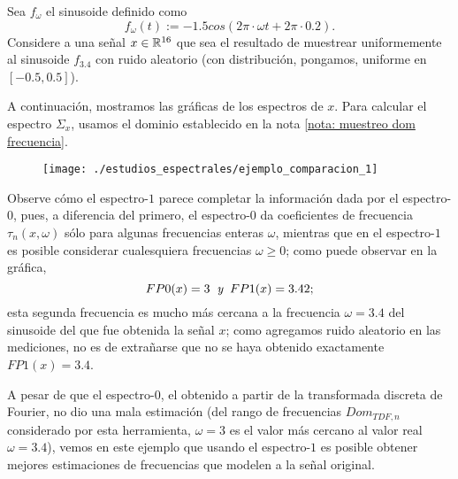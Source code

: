 \begin{ejemplo}
\label{ej: espectros comparacion}

Sea $f_{\omega}$
el sinusoide definido como
\begin{equation}
\label{eq: sinusoide eje}
f_{\omega}(t) := -1.5 cos (2 \pi \cdot \omega t + 2 \pi \cdot 0.2).
\end{equation}
Considere a una señal $x \in \mathbb{R}^{16}$ que sea el resultado
de muestrear uniformemente al sinusoide
$f_{3.4}$
con ruido aleatorio 
(con distribución, pongamos, uniforme en $[-0.5, 0.5]$).

A continuación, mostramos las gráficas
de los espectros de $x$. Para
calcular el espectro $\Sigma_{x}$,
usamos el dominio
establecido en la nota 
\ref{nota: muestreo dom frecuencia}.

\begin{figure}[H]
\centering
    \texttt{[image: ./estudios\_espectrales/ejemplo\_comparacion\_1]}
\end{figure}


Observe cómo el espectro-$1$ parece completar la información
dada por el espectro-$0$, pues, a diferencia del primero,
el espectro-$0$
da coeficientes de frecuencia $\tau_{n}(x, \omega)$ sólo
para algunas frecuencias enteras $\omega$, mientras que en el espectro-$1$
es posible considerar cualesquiera frecuencias $\omega \geq 0$; como puede observar
en la gráfica, 
\[
FP0 (x) = 3 \hspace{0.2cm} \textit{y} \hspace{0.2cm}
FP1 (x) = 3.42;
\]
esta segunda frecuencia es mucho más cercana a
la frecuencia $\omega =3.4$ del sinusoide del que
fue obtenida la señal $x$; como agregamos ruido
aleatorio en las mediciones, no 
es de extrañarse que no se haya
obtenido exactamente $FP1(x) = 3.4$.

A pesar de que el espectro-$0$, el obtenido a partir de la
transformada discreta de Fourier, no dio una mala estimación (del rango
de frecuencias $Dom_{TDF,n}$ considerado por esta herramienta,
$\omega =3$ es el valor más cercano al valor real $\omega = 3.4$), vemos en este
ejemplo que usando el espectro-$1$ es posible obtener mejores
estimaciones de frecuencias que modelen a la señal original. \\


\end{ejemplo}
